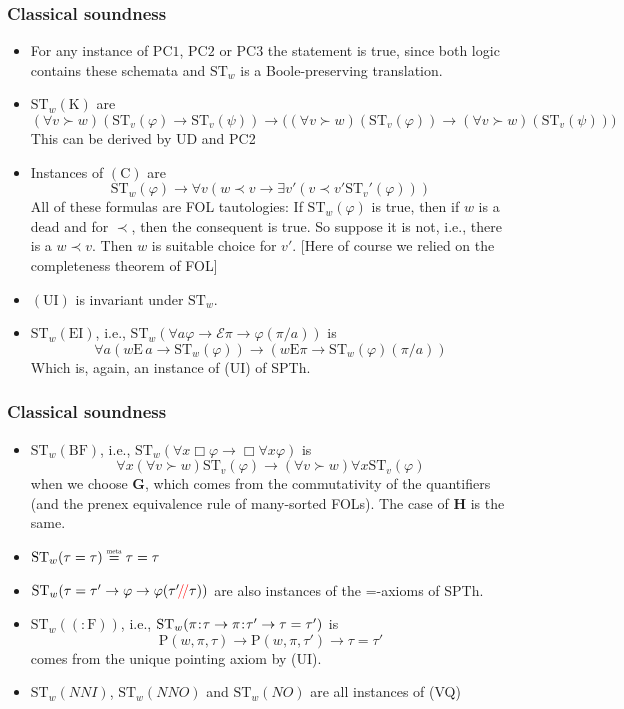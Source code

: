 \documentclass[xcolor=x11names]{beamer}
\newcommand{\bemph}[1] {{\color{DeepSkyBlue3}{#1}}}
\newcommand{\cemph}[1]{\textcolor{red}{#1}}
\newcommand{\FB}{\mathbf G}
\newcommand{\PB}{\mathbf H}
\newcommand{\past}{\succ}
\newcommand{\future}{\prec}
\newcommand{\lthen}{\rightarrow}
\newcommand{\forallp}[1]{(\forall #1)}
\newcommand{\points}[1][0]{\hspace{#1ex}\hspace{-.5ex}:\hspace{-.5ex}\hspace{#1ex}}
\newcommand{\Points}{\mathrm{P}}
\newcommand{\Ex}{\mathrm{E}}
\begin{document}
\begin{frame}[t]
\frametitle{Classical soundness}
\footnotesize
\begin{itemize}
\item For any instance of $\mathrm{PC1}$, $\mathrm{PC2}$ or $\mathrm{PC3}$ the statement is true, since both logic contains these schemata and $\mathrm{ST}_w$ is a Boole-preserving translation.
\item $\mathrm{ST}_w(\mathrm{K})$ are \[\forallp{ v\past w }(\mathrm{ST}_v(\varphi) \lthen \mathrm{ST}_v(\psi)) \lthen \big(\forallp{ v\past w }(\mathrm{ST}_v(\varphi))\lthen \forallp{ v\past w }(\mathrm{ST}_v(\psi))\big)\]
    This can be derived by UD and PC2
\item Instances of $\mathrm{(C)}$ are
\[ \mathrm{ST}_w(\varphi) \lthen \forall v(w\future v \lthen \exists v' (v\future v' \mathrm{ST}_v'(\varphi))) \]
All of these formulas are FOL tautologies: If $\mathrm{ST}_w(\varphi)$ is true, then if $w$ is a dead and for $\future$, then the consequent is true. So suppose it is not, i.e., there is a $w\future v$. Then $w$ is suitable choice for $v'$. [Here of course we relied on the completeness theorem of FOL]
\item $\mathrm{(UI)}$ is invariant under $\mathrm{ST}_w$.
\item $\mathrm{ST}_w(\mathrm{EI})$, i.e., $\mathrm{ST}_w(\forall a \varphi \lthen \mathcal E \pi \lthen \varphi (\pi /a))$ is
\[ \forall a ( w \Ex \, a \lthen \mathrm{ST}_w(\varphi) )\lthen (w \Ex \pi \lthen \mathrm{ST}_w(\varphi)(\pi / a) ) \]
Which is, again, an instance of (UI) of SPTh.
\end{itemize}
\end{frame}

\begin{frame}[t]
\frametitle{Classical soundness}
\footnotesize
\begin{itemize}
\item $\mathrm{ST}_w(\mathrm{BF})$, i.e., $\mathrm{ST}_w(\forall x \Box \varphi \lthen \Box \forall x \varphi)$ is
\[ \forall x \forallp {v\past w} \mathrm{ST}_v(\varphi) \lthen \forallp {v\past w} \forall x\mathrm{ST}_v(\varphi) \]
when we choose $\FB$, which comes from the commutativity of the quantifiers (and the prenex equivalence rule of many-sorted FOLs). The case of $\PB$ is the same.
\item $\mathrm{ST}_w(\tau=\tau) \overset{\scalebox{.5}{$\mathrm{meta}$}}{=} \tau = \tau$
\item $\mathrm{ST}_w(\tau=\tau' \lthen \varphi \lthen \varphi (\tau'\cemph{\!/\!/} \tau ))$ are also instances of the =-axioms of SPTh.
\item $\mathrm{ST}_w(\mathrm{(:F)})$, i.e., $\mathrm{ST}_w(\pi\points \tau \lthen \pi\points\tau' \lthen \tau=\tau')$ is
\[ \Points (w, \pi, \tau) \lthen \Points (w, \pi, \tau') \lthen \tau=\tau' \]
comes from the unique pointing axiom by (UI).
\item $\mathrm{ST}_w(NNI)$, $\mathrm{ST}_w(NNO)$ and $\mathrm{ST}_w(NO)$ are all instances of (VQ) \bemph{(vacuous quantification)}
\end{itemize}
\end{frame}
\end{document}
